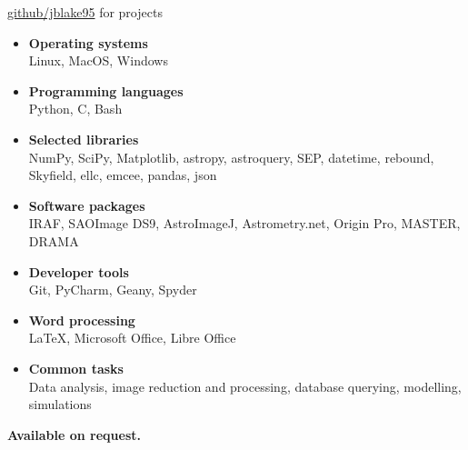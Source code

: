 




\small \faGithub \hspace{2pt} \href{https://github.com/jblake95}{github/jblake95} for projects
\smallskip
\begin{itemize}
	\item \textbf{Operating systems} \\
	Linux, MacOS, Windows
	\item \textbf{Programming languages} \\
	Python, C, Bash
	\item \textbf{Selected libraries} \\
	NumPy, SciPy, Matplotlib, astropy, astroquery, SEP, datetime, rebound, Skyfield, ellc, emcee, pandas, json
	\item \textbf{Software packages} \\
	IRAF, SAOImage DS9, AstroImageJ, Astrometry.net, Origin Pro, MASTER, DRAMA
	\item \textbf{Developer tools} \\
	Git, PyCharm, Geany, Spyder
	\item \textbf{Word processing} \\
	\LaTeX, Microsoft Office, Libre Office
	\item \textbf{Common tasks} \\
	Data analysis, image reduction and processing, database querying, modelling, simulations
\end{itemize}

\medskip


\normalsize \textbf{Available on request.}